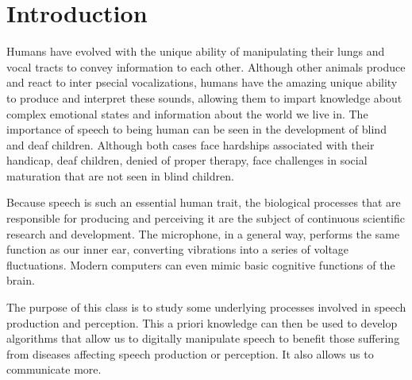 \clearpage
\section{Introduction}
\label{Introduction}




Humans have evolved with the unique ability of manipulating their lungs and vocal tracts to convey information to each other.  Although other animals produce and react to inter psecial vocalizations, humans have the amazing unique ability to produce and interpret these sounds, allowing them to impart knowledge about complex emotional states and information about the world we live in. The importance of speech to being human can be seen in the development of blind and deaf children.  Although both cases face hardships associated with their handicap, deaf children, denied of proper therapy, face challenges in social maturation that are not seen in blind children.

Because speech is such an essential human trait, the biological processes that are responsible for producing and perceiving it are the subject of continuous scientific research and development.  The microphone, in a general way, performs the same function as our inner ear, converting vibrations into a series of voltage fluctuations.  Modern computers can even mimic basic cognitive functions of the brain.

The purpose of this class is to study some underlying processes involved in speech production and perception.  This a priori knowledge can then be used to develop algorithms that allow us to digitally manipulate speech to benefit those suffering from diseases affecting speech production or perception.  It also allows us to communicate more.










